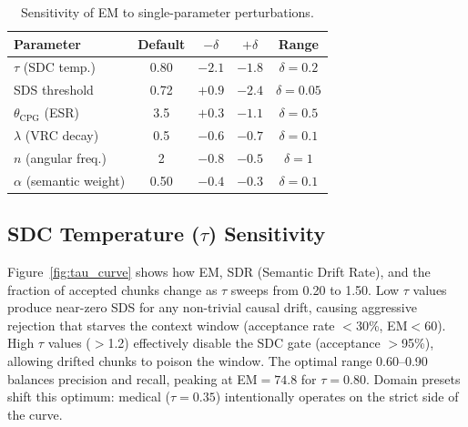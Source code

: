 \documentclass[10pt,twocolumn]{article}
\begin{document}
\begin{table}[h]
\centering
\caption{Sensitivity of EM to single-parameter perturbations.}
\label{tab:sensitivity}
\footnotesize
\setlength{\tabcolsep}{4pt}
\begin{tabular}{@{}lcccc@{}}
\toprule
\textbf{Parameter} & \textbf{Default} & $-\delta$ & $+\delta$ & \textbf{Range} \\
\midrule
$\tau$ (SDC temp.)          & 0.80 & $-2.1$ & $-1.8$ & $\delta=0.2$ \\
SDS threshold               & 0.72 & $+0.9$ & $-2.4$ & $\delta=0.05$ \\
$\theta_\text{CPG}$ (ESR)   & 3.5  & $+0.3$ & $-1.1$ & $\delta=0.5$  \\
$\lambda$ (VRC decay)       & 0.5  & $-0.6$ & $-0.7$ & $\delta=0.1$  \\
$n$ (angular freq.)         & 2    & $-0.8$ & $-0.5$ & $\delta=1$    \\
$\alpha$ (semantic weight)  & 0.50 & $-0.4$ & $-0.3$ & $\delta=0.1$  \\
\bottomrule
\end{tabular}
\end{table}

\subsection{SDC Temperature ($\tau$) Sensitivity}

Figure~\ref{fig:tau_curve} shows how EM, SDR (Semantic Drift Rate), and
the fraction of accepted chunks change as $\tau$ sweeps from 0.20 to 1.50.
Low $\tau$ values produce near-zero SDS for any non-trivial causal drift,
causing aggressive rejection that starves the context window (acceptance
rate $<$30\%, EM$<$60).  High $\tau$ values ($>$1.2) effectively disable the
SDC gate (acceptance $>$95\%), allowing drifted chunks to poison the window.
The optimal range 0.60--0.90 balances precision and recall, peaking at
EM$=74.8$ for $\tau=0.80$.  Domain presets shift this optimum: medical
($\tau=0.35$) intentionally operates on the strict side of the curve.
\end{document}
